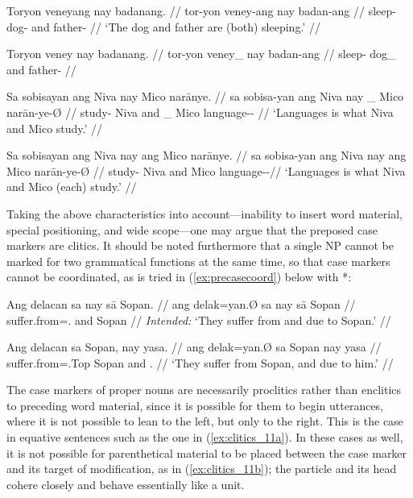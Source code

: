 \pex\label{ex:clitics_7}
\a\label{ex:clitics_7a}\begingl
	\gla Toryon veneyang nay badanang. //
	\glb tor-yon veney-ang nay badan-ang //
	\glc sleep-\TplN{} dog-\Aarg{} and father-\Aarg{} //
	\glft `The dog and father are (both) sleeping.' //
\endgl

\a\label{ex:clitics_7b}\ljudge{*}\begingl
	\gla Toryon veney nay badanang. //
	\glb tor-yon veney\_ nay badan-ang //
	\glc sleep-\TplN{} dog\_ and father-\Aarg{} //
\endgl

\a\label{ex:clitics_7c}\begingl
	\gla Sa sobisayan ang Niva nay {} Mico narānye. //
	\glb sa sobisa-yan ang Niva nay \_ Mico narān-ye-Ø //
	\glc \PatT{} study-\TplM{} \Aarg{} Niva and \_ Mico 
		language-\Pl{}-\Top{} //
	\glft `Languages is what Niva and Mico study.' //
\endgl

\a\label{ex:clitics_7d}\begingl
	\gla Sa sobisayan ang Niva nay ang Mico narānye. //
	\glb sa sobisa-yan ang Niva nay ang Mico narān-ye-Ø //
	\glc \PatT{} study-\TplM{} \Aarg{} Niva and \Aarg{} Mico 
		language-\Pl{}-\Top{}//
	\glft `Languages is what Niva and Mico (each) study.' //
\endgl
\xe


Taking the above characteristics into account---inability to insert word
material, special positioning, and wide scope---one may argue that the preposed
case markers are clitics. It should be noted furthermore that a single NP
cannot be marked for two grammatical functions at the same time, so that case
markers cannot be coordinated, as is tried in (\ref{ex:precasecoord}) below 
with *:

\pex
\a\label{ex:precasecoord}\ljudge*\begingl
	\gla Ang delacan sa nay sā Sopan. //
	\glb ang delak=yan.Ø sa nay sā Sopan //
	\glc \AgtT{} suffer.from=\TplM{}.\Top{} \Parg{} and \Caus{} Sopan //
	\glft \textit{Intended:} `They suffer from and due to Sopan.' //
\endgl

\a\begingl
	\gla Ang delacan sa Sopan, nay yasa. //
	\glb ang delak=yan.Ø sa Sopan nay yasa //
	\glc \AgtT{} suffer.from=\TplM{}.Top{} \Parg{} Sopan and \TsgM{}.\Caus{} //
	\glft `They suffer from Sopan, and due to him.' //
	\endgl
\xe

The case markers of proper nouns are necessarily proclitics rather than
enclitics to preceding word material, since it is possible for them to begin
utterances, where it is not possible to lean to the left, but only to the 
right. This is the case in equative sentences such as the one in 
(\ref{ex:clitics_11a}). In these cases as well, it is not possible for
parenthetical material to be placed between the case marker and its target of
modification, as in (\ref{ex:clitics_11b}); the particle and its head cohere
closely and behave essentially like a unit.

